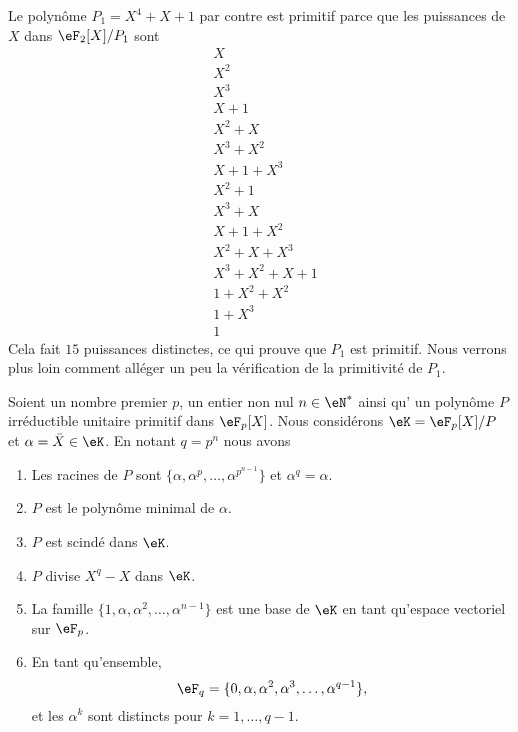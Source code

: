 \begin{example}
	Le polynôme \( P_1=X^4+X+1\) par contre est primitif parce que les puissances de \( X\) dans \( \eF_2[X]/P_1\) sont
	\begin{subequations}
		\begin{align}
			 & X           \\
			 & X^2         \\
			 & X^3         \\
			 & X+1         \\
			 & X^2+X       \\
			 & X^3+X^2     \\
			 & X+1+X^3     \\
			 & X^2+1       \\
			 & X^3+X       \\
			 & X+1+X^2     \\
			 & X^2+X+X^3   \\
			 & X^3+X^2+X+1 \\
			 & 1+X^2+X^2   \\
			 & 1+X^3       \\
			 & 1
		\end{align}
	\end{subequations}
	Cela fait \( 15\) puissances distinctes, ce qui prouve que \( P_1\) est primitif. Nous verrons plus loin comment alléger un peu la vérification de la primitivité de \( P_1\).
\end{example}

\begin{proposition}            \label{PropNsLqWb}
	Soient un nombre premier \( p\), un entier non nul \( n\in \eN^*\) ainsi qu' un polynôme \( P\) irréductible unitaire primitif dans \( \eF_p[X]\). Nous considérons \( \eK=\eF_p[X]/P\) et \( \alpha=\bar X\in \eK\). En notant \( q=p^n\) nous avons
	\begin{enumerate}
		\item
		      Les racines de \( P\) sont \( \{ \alpha,\alpha^p,\ldots, \alpha^{p^{n-1}} \}\) et \( \alpha^q=\alpha\).
		\item
		      \( P\) est le polynôme minimal de \( \alpha\).
		\item
		      \( P\) est scindé dans \( \eK\).
		\item
		      \( P\) divise \( X^q-X\) dans \( \eK\).
		\item
		      La famille \( \{1, \alpha,\alpha^2,\ldots, \alpha^{n-1} \}\) est une base de \( \eK\) en tant qu'espace vectoriel sur \( \eF_p\).
		\item
		      En tant qu'ensemble,
		      \begin{equation}
			      \eF_q=\{0, \alpha,\alpha^2,\alpha^3,\ldots, \alpha^{q-1} \},
		      \end{equation}
		      et les \( \alpha^k\) sont distincts pour \( k=1,\ldots, q-1\).
	\end{enumerate}
\end{proposition}

